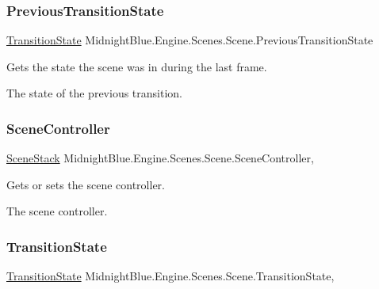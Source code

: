 \subsubsection{\texorpdfstring{Previous\+Transition\+State}{PreviousTransitionState}}
{\footnotesize\ttfamily \hyperlink{namespace_midnight_blue_1_1_engine_1_1_scenes_a829c47ebe553886b3b3e92db386e2557}{Transition\+State} Midnight\+Blue.\+Engine.\+Scenes.\+Scene.\+Previous\+Transition\+State\hspace{0.3cm}{\ttfamily [get]}}



Gets the state the scene was in during the last frame. 

The state of the previous transition.\hypertarget{class_midnight_blue_1_1_engine_1_1_scenes_1_1_scene_a1a8c2aa7f4d60a3a99043f31392ddecb}{}\label{class_midnight_blue_1_1_engine_1_1_scenes_1_1_scene_a1a8c2aa7f4d60a3a99043f31392ddecb} 
\subsubsection{\texorpdfstring{Scene\+Controller}{SceneController}}
{\footnotesize\ttfamily \hyperlink{class_midnight_blue_1_1_engine_1_1_scenes_1_1_scene_stack}{Scene\+Stack} Midnight\+Blue.\+Engine.\+Scenes.\+Scene.\+Scene\+Controller\hspace{0.3cm}{\ttfamily [get]}, {\ttfamily [set]}}



Gets or sets the scene controller. 

The scene controller.\hypertarget{class_midnight_blue_1_1_engine_1_1_scenes_1_1_scene_a6c674383c2a71025e9ab2f6c5e0d1139}{}\label{class_midnight_blue_1_1_engine_1_1_scenes_1_1_scene_a6c674383c2a71025e9ab2f6c5e0d1139} 
\subsubsection{\texorpdfstring{Transition\+State}{TransitionState}}
{\footnotesize\ttfamily \hyperlink{namespace_midnight_blue_1_1_engine_1_1_scenes_a829c47ebe553886b3b3e92db386e2557}{Transition\+State} Midnight\+Blue.\+Engine.\+Scenes.\+Scene.\+Transition\+State\hspace{0.3cm}{\ttfamily [get]}, {\ttfamily [set]}}



